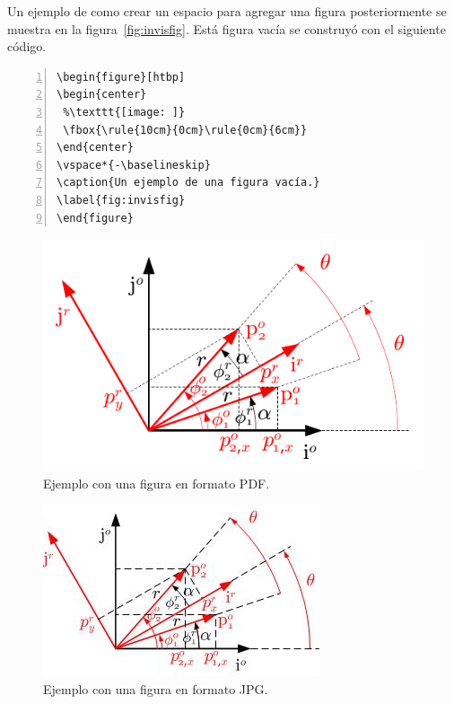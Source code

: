 \documentclass[11pt,letterpaper,twoside]{report}%
\begin{document}
Un ejemplo de como crear un espacio para agregar una figura posteriormente se muestra en la figura~\ref{fig:invisfig}.  Está figura vacía se construyó con el siguiente código.

\begin{Verbatim}[frame=single,framesep=5mm,rulecolor=\color{gray},numbers=left,numbersep=-10pt]
\begin{figure}[htbp]
\begin{center}
 %\texttt{[image: ]}
 \fbox{\rule{10cm}{0cm}\rule{0cm}{6cm}}
\end{center}
\vspace*{-\baselineskip}
\caption{Un ejemplo de una figura vacía.}
\label{fig:invisfig} 
\end{figure}
\end{Verbatim}

\begin{figure}[htbp]
\begin{center}
 \includegraphics[scale=1.5]{figs/prueba.pdf}
\end{center}
\vspace*{-\baselineskip}
\caption{Ejemplo con una figura en formato PDF.}
\label{fig:ejemplo_figura_pdf} 
\end{figure}

\begin{figure}[htbp]
\begin{center}
 \includegraphics[scale=1.5]{figs/prueba.jpg}
\end{center}
\vspace*{-\baselineskip}
\caption{Ejemplo con una figura en formato JPG.}
\label{fig:ejemplo_figura_jpg} 
\end{figure}
\end{document}
